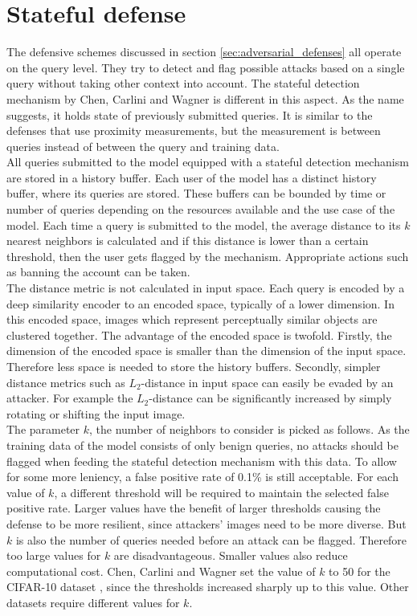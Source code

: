 \section{Stateful defense}\label{sec:stateful_detection}
The defensive schemes discussed in section \ref{sec:adversarial_defenses} all operate on the query level. They try to detect and flag possible attacks based on a single query without taking other context into account. The stateful detection mechanism by Chen, Carlini and Wagner \cite{chen_stateful_2019} is different in this aspect. As the name suggests, it holds state of previously submitted queries. It is similar to the defenses that use proximity measurements, but the measurement is between queries instead of between the query and training data.\\

All queries submitted to the model equipped with a stateful detection mechanism are stored in a history buffer. Each user of the model has a distinct history buffer, where its queries are stored. These buffers can be bounded by time or number of queries depending on the resources available and the use case of the model. Each time a query is submitted to the model, the average distance to its $k$ nearest neighbors is calculated and if this distance is lower than a certain threshold, then the user gets flagged by the mechanism. Appropriate actions such as banning the account can be taken.\\

The distance metric is not calculated in input space. Each query is encoded by a deep similarity encoder \cite{deep_similarity_encoder} to an encoded space, typically of a lower dimension. In this encoded space, images which represent perceptually similar objects are clustered together. The advantage of the encoded space is twofold. Firstly, the dimension of the encoded space is smaller than the dimension of the input space. Therefore less space is needed to store the history buffers. Secondly, simpler distance metrics such as $L_2$-distance in input space can easily be evaded by an attacker. For example the $L_2$-distance can be significantly increased by simply rotating or shifting the input image.\\

The parameter $k$, the number of neighbors to consider is picked as follows. As the training data of the model consists of only benign queries, no attacks should be flagged when feeding the stateful detection mechanism with this data. To allow for some more leniency, a false positive rate of 0.1\% is still acceptable. For each value of $k$, a different threshold will be required to maintain the selected false positive rate. Larger values have the benefit of larger thresholds causing the defense to be more resilient, since attackers' images need to be more diverse. But $k$ is also the number of queries needed before an attack can be flagged. Therefore too large values for $k$ are disadvantageous. Smaller values also reduce computational cost. Chen, Carlini and Wagner set the value of $k$ to 50 for the CIFAR-10  dataset \cite{cifar}, since the thresholds increased sharply up to this value. Other datasets require different values for $k$.

